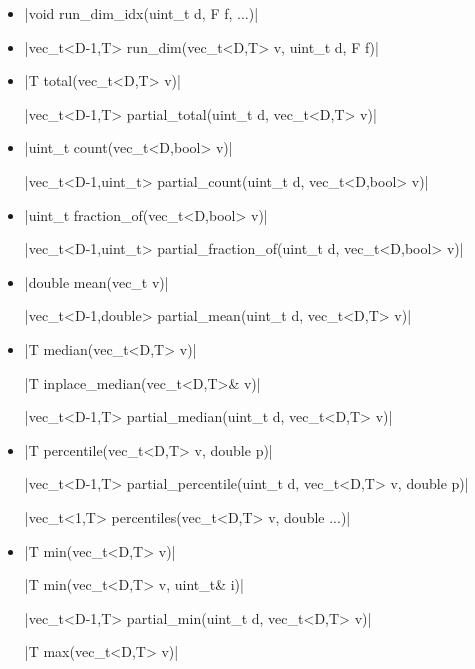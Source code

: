 \documentclass[12pt]{report}
\begin{document}
\begin{itemize}
\item \cppinline|void run_dim_idx(uint_t d, F f, ...)| 

\item \cppinline|vec_t<D-1,T> run_dim(vec_t<D,T> v, uint_t d, F f)| 

\item \cppinline|T total(vec_t<D,T> v)| 

\cppinline|vec_t<D-1,T> partial_total(uint_t d, vec_t<D,T> v)| 

\item \cppinline|uint_t count(vec_t<D,bool> v)| 

\cppinline|vec_t<D-1,uint_t> partial_count(uint_t d, vec_t<D,bool> v)| 

\item \cppinline|uint_t fraction_of(vec_t<D,bool> v)| 

\cppinline|vec_t<D-1,uint_t> partial_fraction_of(uint_t d, vec_t<D,bool> v)| 

\item \cppinline|double mean(vec_t v)| 

\cppinline|vec_t<D-1,double> partial_mean(uint_t d, vec_t<D,T> v)| 

\item \cppinline|T median(vec_t<D,T> v)| 

\cppinline|T inplace_median(vec_t<D,T>& v)| 

\cppinline|vec_t<D-1,T> partial_median(uint_t d, vec_t<D,T> v)| 

\item \cppinline|T percentile(vec_t<D,T> v, double p)| 

\cppinline|vec_t<D-1,T> partial_percentile(uint_t d, vec_t<D,T> v, double p)| 

\cppinline|vec_t<1,T> percentiles(vec_t<D,T> v, double ...)| 

\item \cppinline|T min(vec_t<D,T> v)| 

\cppinline|T min(vec_t<D,T> v, uint_t& i)|

\cppinline|vec_t<D-1,T> partial_min(uint_t d, vec_t<D,T> v)| 

\cppinline|T max(vec_t<D,T> v)| 


\end{itemize}
\end{document}
